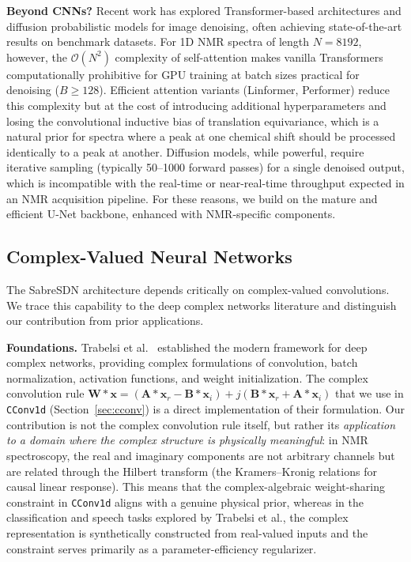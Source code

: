 \textbf{Beyond CNNs?}
Recent work has explored Transformer-based architectures \cite{Liang2021}
and diffusion probabilistic models \cite{Ho2020} for image denoising, often
achieving state-of-the-art results on benchmark datasets. For 1D NMR spectra
of length $N = 8192$, however, the $\mathcal{O}(N^2)$ complexity of
self-attention makes vanilla Transformers computationally prohibitive for
GPU training at batch sizes practical for denoising ($B \geq 128$).
Efficient attention variants (Linformer, Performer) reduce this complexity
but at the cost of introducing additional hyperparameters and losing the
convolutional inductive bias of translation equivariance, which is a natural
prior for spectra where a peak at one chemical shift should be processed
identically to a peak at another. Diffusion models, while powerful, require
iterative sampling (typically 50--1000 forward passes) for a single denoised
output, which is incompatible with the real-time or near-real-time throughput
expected in an NMR acquisition pipeline. For these reasons, we build on the
mature and efficient U-Net backbone, enhanced with NMR-specific components.

\subsection{Complex-Valued Neural Networks}
\label{sec:rw_complex}

The SabreSDN architecture depends critically on complex-valued convolutions.
We trace this capability to the deep complex networks literature and
distinguish our contribution from prior applications.

\textbf{Foundations.}
Trabelsi et al.\ \cite{Trabelsi2018} established the modern framework for
deep complex networks, providing complex formulations of convolution,
batch normalization, activation functions, and weight initialization.
The complex convolution rule
$\mathbf{W} * \mathbf{x} = (\mathbf{A} * \mathbf{x}_r - \mathbf{B} * \mathbf{x}_i) +
j(\mathbf{B} * \mathbf{x}_r + \mathbf{A} * \mathbf{x}_i)$
that we use in \texttt{CConv1d} (Section~\ref{sec:cconv}) is a direct
implementation of their formulation. Our contribution is not the complex
convolution rule itself, but rather its \emph{application to a domain where
the complex structure is physically meaningful}: in NMR spectroscopy, the
real and imaginary components are not arbitrary channels but are related
through the Hilbert transform (the Kramers--Kronig relations for causal
linear response). This means that the complex-algebraic weight-sharing
constraint in \texttt{CConv1d} aligns with a genuine physical prior, whereas
in the classification and speech tasks explored by Trabelsi et al., the
complex representation is synthetically constructed from real-valued inputs
and the constraint serves primarily as a parameter-efficiency regularizer.

